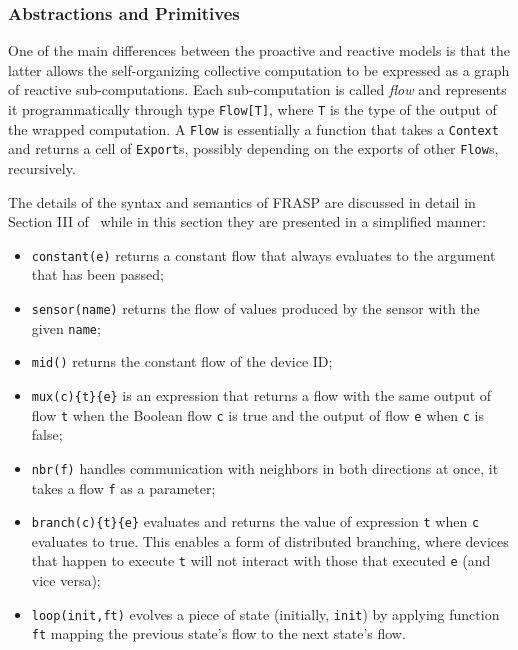 \subsubsection{Abstractions and Primitives}

One of the main differences between the proactive and reactive models is that the latter allows the self-organizing collective computation to be expressed as a graph of reactive sub-computations. Each sub-computation is called \textit{flow} and represents it programmatically through type \texttt{Flow[T]}, where \texttt{T} is the type of the output of the wrapped computation. A \texttt{Flow} is essentially a function that takes a \texttt{Context} and returns a cell of \texttt{Export}s, possibly depending on the exports of other \texttt{Flow}s, recursively.

The details of the syntax and semantics of FRASP are discussed in detail in Section III of~\cite{Casadei2023} while in this section they are presented in a simplified manner:

\begin{itemize}
    \item \texttt{constant(e)} returns a constant flow that always evaluates to the argument that has been passed;
    \item \texttt{sensor(name)} returns the flow of values produced by the sensor with the given \texttt{name};
    \item \texttt{mid()} returns the constant flow of the device ID;
    \item \texttt{mux(c)\{t\}\{e\}} is an expression that returns a flow with the same output of flow \texttt{t} when the Boolean flow \texttt{c} is true and the output of flow \texttt{e} when \texttt{c} is false;
    \item \texttt{nbr(f)} handles communication with neighbors in both directions at once, it takes a flow \texttt{f} as a parameter;
    \item \texttt{branch(c)\{t\}\{e\}} evaluates and returns the value of expression \texttt{t} when \texttt{c} evaluates to true. This enables a form of distributed branching, where devices that happen to execute \texttt{t} will not interact with those that executed \texttt{e} (and vice versa);
    \item \texttt{loop(init,ft)} evolves a piece of state (initially, \texttt{init}) by applying function \texttt{ft} mapping the previous state's flow to the next state's flow.
\end{itemize}

